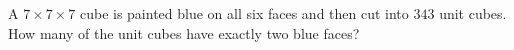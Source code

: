 A $7\times7\times7$ cube is painted blue on all six faces and then cut into $343$ unit cubes. How many of the unit cubes have exactly two blue faces?
